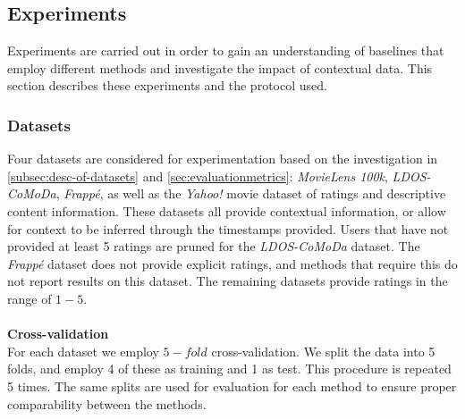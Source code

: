 \subsection{Experiments}
Experiments are carried out in order to gain an understanding of baselines that employ different methods and investigate the impact of contextual data.
This section describes these experiments and the protocol used.

\subsubsection{Datasets}
Four datasets are considered for experimentation based on the investigation in \autoref{subsec:desc-of-datasets} and \autoref{sec:evaluationmetrics}: \textit{MovieLens 100k}, \textit{LDOS-CoMoDa}, \textit{Frappé}, as well as the \textit{Yahoo!} movie dataset of ratings and descriptive content information\cite{yahoo-movie}.
These datasets all provide contextual information, or allow for context to be inferred through the timestamps provided.
Users that have not provided at least 5 ratings are pruned for the \textit{LDOS-CoMoDa} dataset.
The \textit{Frappé} dataset does not provide explicit ratings, and methods that require this do not report results on this dataset.
The remaining datasets provide ratings in the range of $1-5$.
\\\\
\textbf{Cross-validation}\\
For each dataset we employ $5-fold$ cross-validation.
We split the data into 5 folds, and employ 4 of these as training and 1 as test.
This procedure is repeated 5 times.
The same splits are used for evaluation for each method to ensure proper comparability between the methods.


